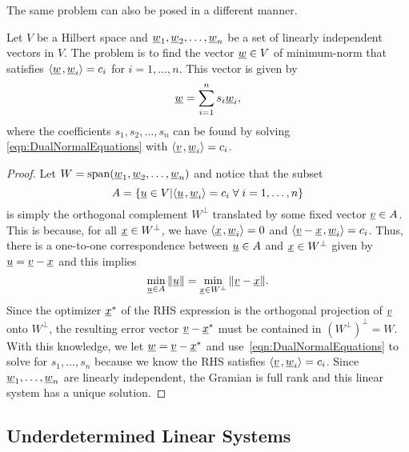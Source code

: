 The same problem can also be posed in a different manner.
\begin{theorem}
\label{thm:dual_approx}
Let $V$ be a Hilbert space and $\underline{w}_1 ,\underline{w}_2 , \ldots, \underline{w}_n$ be a set of linearly independent vectors in $V$.
The  problem is to find the vector $\underline{w}\in V$ of minimum-norm that satisfies ${\left\langle  \underline{w}  \mskip2mu ,  \underline{w}_i  \right\rangle} = c_i$ for $i=1,\ldots,n$.
This vector is given by
\begin{equation} \label{equation:DualApproximation}
\underline{w} = \sum_{i=1}^n s_i \underline{w}_i,
\end{equation}
where the coefficients  $s_1,s_2,\ldots,s_n$ can be found by solving \eqref{eqn:DualNormalEquations} with ${\left\langle  \underline{v}  \mskip2mu ,  \underline{w}_i  \right\rangle} = c_i$.
\end{theorem}
\begin{proof}
Let $W = \mathrm{span}(\underline{w}_1 ,\underline{w}_2 , \ldots, \underline{w}_n)$ and notice that the subset
\[ A = \{ \underline{u} \in V | {\left\langle  \underline{u}  \mskip2mu ,  \underline{w}_i  \right\rangle} = c_i\; \forall\; i=1,\ldots,n \} \]
is simply the orthogonal complement $W^{\bot}$ translated by some fixed vector $\underline{v}\in A$.
This is because, for all $\underline{x} \in W^{\perp}$, we have ${\left\langle  \underline{x}  \mskip2mu ,  \underline{w}_i  \right\rangle} = 0$ and ${\left\langle  \underline{v} - \underline{x}  \mskip2mu ,  \underline{w}_i  \right\rangle} = c_i$.
Thus, there is a one-to-one correspondence between $\underline{u} \in A$ and $\underline{x}\in W^\perp$ given by $\underline{u} = \underline{v}-\underline{x}$ and this implies
\[ \min_{\underline{u}\in A} \| \underline{u} \|  = \min_{\underline{x}\in W^{\perp}} \| \underline{v} - \underline{x} \|. \]
Since the optimizer $\underline{x}^*$ of the RHS expression is the orthogonal projection of $\underline{v}$ onto $W^\perp$, the resulting error vector $\underline{v}-\underline{x}^*$ must be contained in $(W^\perp)^\perp = W$.
With this knowledge, we let $\underline{w} = \underline{v}-\underline{x}^*$ and use~\eqref{eqn:DualNormalEquations} to solve for $s_1,\ldots,s_n$ because we know the RHS satisfies ${\left\langle  \underline{v}  \mskip2mu ,  \underline{w}_i  \right\rangle} = c_i$.
Since $\underline{w}_1,\ldots,\underline{w}_n$ are linearly independent, the Gramian is full rank and this linear system has a unique solution.
\end{proof}

\subsection{Underdetermined Linear Systems}

